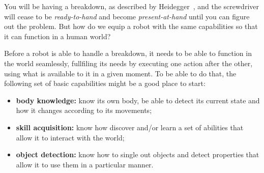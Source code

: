 \documentclass{article}
\begin{document}
You will be having a breakdown, as described by Heidegger~\cite{dreyfus07}, and
the screwdriver will cease to be \emph{ready-to-hand} and become
\emph{present-at-hand} until you can figure out the problem. But how do we equip
a robot with the same capabilities so that it can function in a human world?


Before a robot is able to handle a breakdown, it needs to be able to function in
the world seamlessly, fullfiling its needs by executing one action after the
other, using what is available to it in a given moment. To be able to do that,
the following set of basic capabilities might be a good place to start:

\begin{itemize}
\item \textbf{body knowledge:} know its own body, be able to detect its current
state and how it changes according to its movements;
\item \textbf{skill acquisition:} know how discover and/or learn a set of
abilities that allow it to interact with the world;
\item \textbf{object detection:} know how to single out objects and detect
properties that allow it to use them in a particular manner.
\end{itemize}



\end{document}
